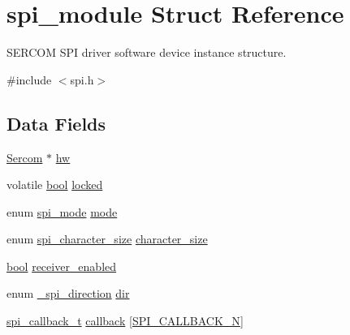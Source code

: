 \hypertarget{structspi__module}{}\section{spi\+\_\+module Struct Reference}
\label{structspi__module}


S\+E\+R\+C\+OM S\+PI driver software device instance structure.  




{\ttfamily \#include $<$spi.\+h$>$}

\subsection*{Data Fields}
\begin{DoxyCompactItemize}
\item 
\mbox{\hyperlink{union_sercom}{Sercom}} $\ast$ \mbox{\hyperlink{structspi__module_a0c1e47f7408dce5f667a53398c82d13a}{hw}}
\item 
volatile \mbox{\hyperlink{group__group__sam0__utils_ga97a80ca1602ebf2303258971a2c938e2}{bool}} \mbox{\hyperlink{structspi__module_a765892434f9329ded45a5287eeb75957}{locked}}
\item 
enum \mbox{\hyperlink{group__asfdoc__sam0__sercom__spi__group_ga78c1313670220bedfecdb138d4c27903}{spi\+\_\+mode}} \mbox{\hyperlink{structspi__module_aa56044693231ac71d809d1c28e94800a}{mode}}
\item 
enum \mbox{\hyperlink{group__asfdoc__sam0__sercom__spi__group_ga79e8becd0bcea19b99e7eb7fe8a9d6b7}{spi\+\_\+character\+\_\+size}} \mbox{\hyperlink{structspi__module_a7ca9bf5df3e678e26819ff8444041797}{character\+\_\+size}}
\item 
\mbox{\hyperlink{group__group__sam0__utils_ga97a80ca1602ebf2303258971a2c938e2}{bool}} \mbox{\hyperlink{structspi__module_aa555f88ee76a65a51c526b3e912b711d}{receiver\+\_\+enabled}}
\item 
enum \mbox{\hyperlink{group__asfdoc__sam0__sercom__spi__group_ga3790f767d410bc7d70fe0772fe7044f7}{\+\_\+spi\+\_\+direction}} \mbox{\hyperlink{structspi__module_af071d306856d4f8f2f0ef443d334f5bb}{dir}}
\item 
\mbox{\hyperlink{group__asfdoc__sam0__sercom__spi__group_ga88d771c03a254735de0053be3fa513ca}{spi\+\_\+callback\+\_\+t}} \mbox{\hyperlink{structspi__module_a575b1df3b35bc459cf4165cc2af8f692}{callback}} \mbox{[}\mbox{\hyperlink{group__asfdoc__sam0__sercom__spi__group_gga4afb8830e0197ec11f6beb8140210a88a5941b69aff1bf66f116be84ddf1c1218}{S\+P\+I\+\_\+\+C\+A\+L\+L\+B\+A\+C\+K\+\_\+N}}\mbox{]}

\end{DoxyCompactItemize}
